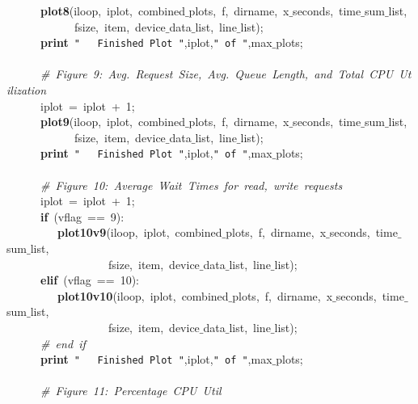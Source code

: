 \mbox{}\ \ \ \ \ \ \textbf{plot8}(iloop,\ iplot,\ combined$\_$plots,\ f,\ dirname,\ x$\_$seconds,\ time$\_$sum$\_$list, \\
\mbox{}\ \ \ \ \ \ \ \ \ \ \ \ fsize,\ item,\ device$\_$data$\_$list,\ line$\_$list); \\
\mbox{}\ \ \ \ \ \ \textbf{print}\ \texttt{"{}\ \ \ Finished\ Plot\ "{}},iplot,\texttt{"{}\ of\ "{}},max$\_$plots; \\
\mbox{} \\
\mbox{}\ \ \ \ \ \ \textit{\#\ Figure\ 9:\ Avg.\ Request\ Size,\ Avg.\ Queue\ Length,\ and\ Total\ CPU\ Utilization} \\
\mbox{}\ \ \ \ \ \ iplot\ =\ iplot\ +\ 1; \\
\mbox{}\ \ \ \ \ \ \textbf{plot9}(iloop,\ iplot,\ combined$\_$plots,\ f,\ dirname,\ x$\_$seconds,\ time$\_$sum$\_$list, \\
\mbox{}\ \ \ \ \ \ \ \ \ \ \ \ fsize,\ item,\ device$\_$data$\_$list,\ line$\_$list); \\
\mbox{}\ \ \ \ \ \ \textbf{print}\ \texttt{"{}\ \ \ Finished\ Plot\ "{}},iplot,\texttt{"{}\ of\ "{}},max$\_$plots; \\
\mbox{} \\
\mbox{}\ \ \ \ \ \ \textit{\#\ Figure\ 10:\ Average\ Wait\ Times\ for\ read,\ write\ requests} \\
\mbox{}\ \ \ \ \ \ iplot\ =\ iplot\ +\ 1; \\
\mbox{}\ \ \ \ \ \ \textbf{if}\ (vflag\ ==\ 9): \\
\mbox{}\ \ \ \ \ \ \ \ \ \textbf{plot10v9}(iloop,\ iplot,\ combined$\_$plots,\ f,\ dirname,\ x$\_$seconds,\ time$\_$sum$\_$list, \\
\mbox{}\ \ \ \ \ \ \ \ \ \ \ \ \ \ \ \ \ \ fsize,\ item,\ device$\_$data$\_$list,\ line$\_$list); \\
\mbox{}\ \ \ \ \ \ \textbf{elif}\ (vflag\ ==\ 10): \\
\mbox{}\ \ \ \ \ \ \ \ \ \textbf{plot10v10}(iloop,\ iplot,\ combined$\_$plots,\ f,\ dirname,\ x$\_$seconds,\ time$\_$sum$\_$list, \\
\mbox{}\ \ \ \ \ \ \ \ \ \ \ \ \ \ \ \ \ \ fsize,\ item,\ device$\_$data$\_$list,\ line$\_$list); \\
\mbox{}\ \ \ \ \ \ \textit{\#\ end\ if} \\
\mbox{}\ \ \ \ \ \ \textbf{print}\ \texttt{"{}\ \ \ Finished\ Plot\ "{}},iplot,\texttt{"{}\ of\ "{}},max$\_$plots; \\
\mbox{} \\
\mbox{}\ \ \ \ \ \ \textit{\#\ Figure\ 11:\ Percentage\ CPU\ Util} \\
